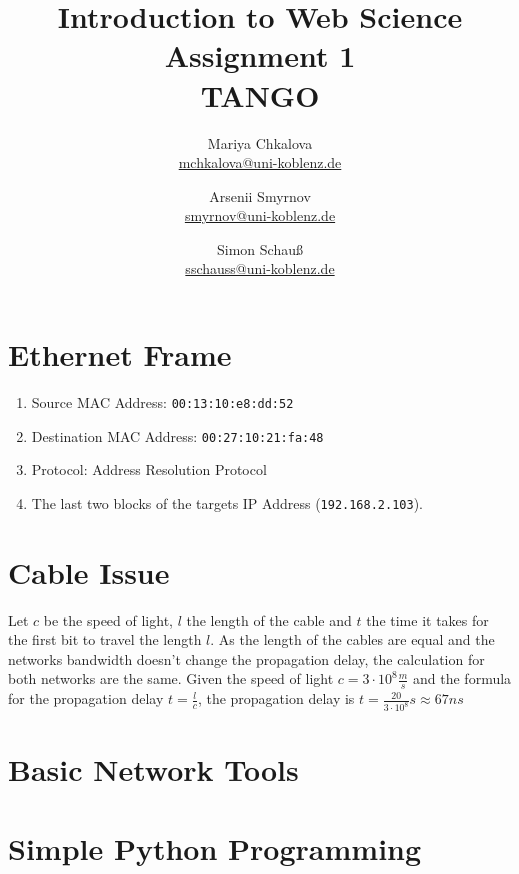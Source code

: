 \documentclass[12pt]{article}
\title{
	\Huge{Introduction to Web Science} \\
	\vspace{1em}
	\LARGE{Assignment 1} \\
	\vspace{1em}
	\Large{TANGO}
}
\author {
	Mariya Chkalova \\{\normalsize\href{mailto:mchkalova@uni-koblenz.de}{mchkalova@uni-koblenz.de}} \and
	Arsenii Smyrnov \\{\normalsize\href{mailto:smyrnov@uni-koblenz.de}{smyrnov@uni-koblenz.de}} \and
	Simon Schau\ss \\{\normalsize\href{mailto:sschauss@uni-koblenz.de}{sschauss@uni-koblenz.de}}
}
\date{}
\begin{document}
\maketitle
{}
\newpage


\section{Ethernet Frame}

\begin{enumerate}
	\item Source MAC Address: \texttt{00:13:10:e8:dd:52}
	\item Destination MAC Address: \texttt{00:27:10:21:fa:48}
	\item Protocol: Address Resolution Protocol 
	\item The last two blocks of the targets IP Address (\texttt{192.168.2.103}).
\end{enumerate}

\section{Cable Issue}

Let $c$ be the speed of light, $l$ the length of the cable and $t$ the time it takes for the first bit to travel the length $l$. 
As the length of the cables are equal and the networks bandwidth doesn't change the propagation delay, the calculation for both networks are the same.  
Given the speed of light $c = 3 \cdot 10^8 \frac{m}{s}$ and the formula for the propagation delay $t = \frac{l}{c}$, the propagation delay is $t = \frac{20}{3 \cdot 10^8}s \approx 67ns$

\section{Basic Network Tools}

\section{Simple Python Programming}
\end{document}
